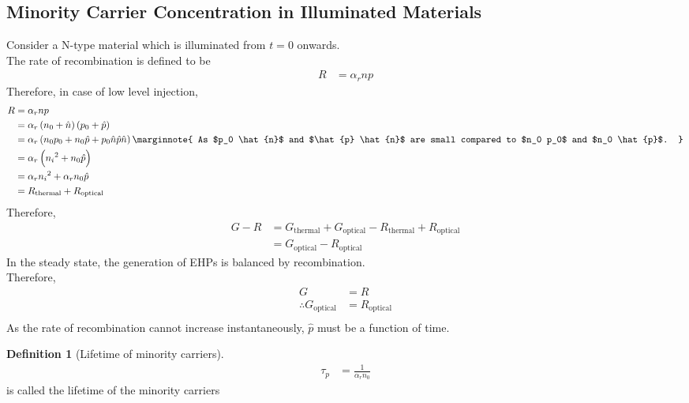 \documentclass[titlepage, fleqn, a4paper, 12pt, twoside]{article}
\theoremstyle{definition}
\newtheorem{definition}{Definition}
\theoremstyle{theorem}
\begin{document}
\subsection{Minority Carrier Concentration in Illuminated Materials}

Consider a N-type material which is illuminated from $t = 0$ onwards.\\
The rate of recombination is defined to be
\begin{align*}
	R &= \alpha_r n p
\end{align*}
Therefore, in case of low level injection,
\begin{align*}
	R &= \alpha_r n p\\
	&= \alpha_r \left( n_0 + \hat{n} \right) \left( p_0 + \hat{p} \right)\\
	&= \alpha_r \left( n_0 p_0 + n_0 \hat{p} + p_0 \hat{n} \hat{p} \hat{n} \right)
	\marginnote
	{
		As $p_0 \hat{n}$ and $\hat{p} \hat{n}$ are small compared to $n_0 p_0$ and $n_0 \hat{p}$.
	}\\
	&= \alpha_r \left( {n_i}^2 + n_0 \hat{p} \right)\\
	&= \alpha_r {n_i}^2 + \alpha_r n_0 \hat{p}\\
	&= R_{\text{thermal}} + R_{\text{optical}}
\end{align*}
Therefore,
\begin{align*}
	G - R &= G_{\text{thermal}} + G_{\text{optical}} - R_{\text{thermal}} + R_{\text{optical}}\\
	&= G_{\text{optical}} - R_{\text{optical}}
\end{align*}
In the steady state, the generation of EHPs is balanced by recombination.\\
Therefore,
\begin{align*}
	G &= R\\
	\therefore G_{\text{optical}} &= R_{\text{optical}}\\
\end{align*}
As the rate of recombination cannot increase instantaneously, $\hat{p}$ must be a function of time.

\begin{definition}[Lifetime of minority carriers]
	\begin{align*}
		\tau_p &= \frac{1}{\alpha_r n_0}
	\end{align*}
	is called the lifetime of the minority carriers
\end{definition}
\end{document}
